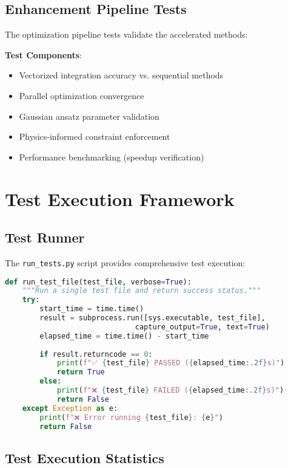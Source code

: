 \documentclass[12pt]{article}
\begin{document}
\subsection{Enhancement Pipeline Tests}

The optimization pipeline tests validate the accelerated methods:

\textbf{Test Components}:
\begin{itemize}
\item Vectorized integration accuracy vs. sequential methods
\item Parallel optimization convergence
\item Gaussian ansatz parameter validation
\item Physics-informed constraint enforcement
\item Performance benchmarking (speedup verification)
\end{itemize}

\section{Test Execution Framework}

\subsection{Test Runner}

The \texttt{run\_tests.py} script provides comprehensive test execution:

\begin{lstlisting}[language=Python, caption=Test Runner Example]
def run_test_file(test_file, verbose=True):
    """Run a single test file and return success status."""
    try:
        start_time = time.time()
        result = subprocess.run([sys.executable, test_file], 
                              capture_output=True, text=True)
        elapsed_time = time.time() - start_time
        
        if result.returncode == 0:
            print(f"✅ {test_file} PASSED ({elapsed_time:.2f}s)")
            return True
        else:
            print(f"❌ {test_file} FAILED ({elapsed_time:.2f}s)")
            return False
    except Exception as e:
        print(f"❌ Error running {test_file}: {e}")
        return False
\end{lstlisting}

\subsection{Test Execution Statistics}
\end{document}

